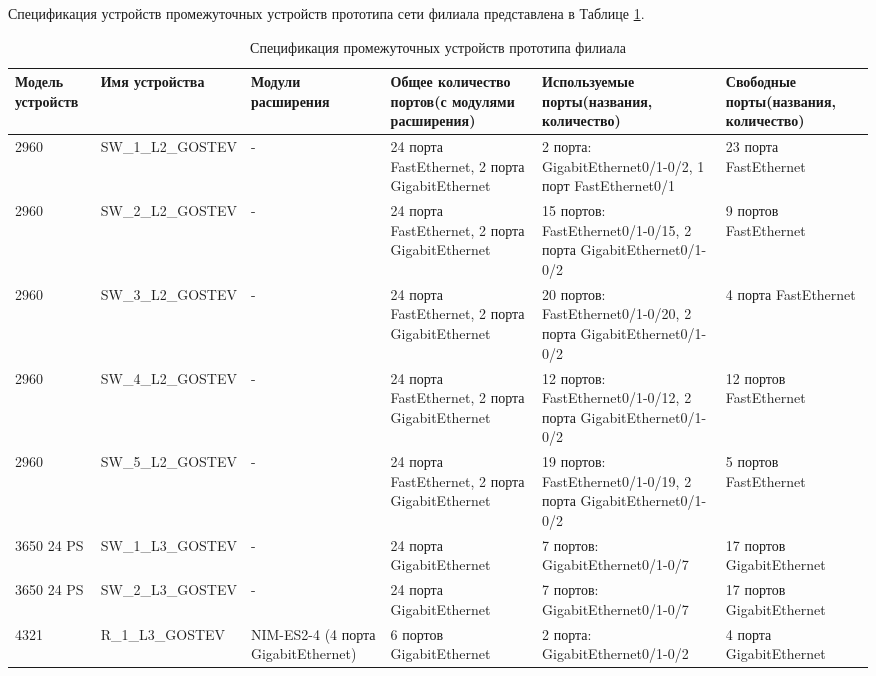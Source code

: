 \documentclass[14pt, a4paper]{extarticle}
\numberwithin{equation}{section}
\begin{document}
\begin{landscape}
        
Спецификация устройств промежуточных устройств прототипа сети филиала представлена в Таблице \ref{table:filialDevicesSpecs}.

\begin{table}[H]
\centering
\small
\caption{Спецификация промежуточных устройств прототипа филиала}
\label{table:filialDevicesSpecs}
\begin{tabular}{|m{2.5cm}|m{4cm}|m{3cm}|m{4.2cm}|m{5.3cm}|m{4cm}|}
\hline
\textbf{Модель устройств} & \textbf{Имя устройства} & \textbf{Модули расширения} & \textbf{Общее количество портов(с модулями расширения)} & \textbf{Используемые порты(названия, количество)} & \textbf{Свободные порты(названия, количество)} \\
\hline
2960 & 
SW\_1\_L2\_GOSTEV & 
- & 
24 порта FastEthernet, 2 порта GigabitEthernet &
2 порта: GigabitEthernet0/1-0/2, 1 порт FastEthernet0/1 &
23 порта FastEthernet \\
\hline
2960 & 
SW\_2\_L2\_GOSTEV & 
- & 
24 порта FastEthernet, 2 порта GigabitEthernet & 
15 портов: FastEthernet0/1-0/15, 2 порта GigabitEthernet0/1-0/2 & 
9 портов FastEthernet \\
\hline
2960 &
SW\_3\_L2\_GOSTEV &
- &
24 порта FastEthernet, 2 порта GigabitEthernet &
20 портов: FastEthernet0/1-0/20, 2 порта GigabitEthernet0/1-0/2 &
4 порта FastEthernet \\
\hline
2960 &
SW\_4\_L2\_GOSTEV &
- &
24 порта FastEthernet, 2 порта GigabitEthernet &
12 портов: FastEthernet0/1-0/12, 2 порта GigabitEthernet0/1-0/2 &
12 портов FastEthernet \\
\hline
2960 &
SW\_5\_L2\_GOSTEV &
- &
24 порта FastEthernet, 2 порта GigabitEthernet &
19 портов: FastEthernet0/1-0/19, 2 порта GigabitEthernet0/1-0/2 &
5 портов FastEthernet \\
\hline
3650 24 PS &
SW\_1\_L3\_GOSTEV &
- &
24 порта GigabitEthernet &
7 портов: GigabitEthernet0/1-0/7 &
17 портов GigabitEthernet \\
\hline
3650 24 PS &
SW\_2\_L3\_GOSTEV &
- &
24 порта GigabitEthernet &
7 портов: GigabitEthernet0/1-0/7 &
17 портов GigabitEthernet \\
\hline
4321 &
R\_1\_L3\_GOSTEV &
NIM-ES2-4 (4 порта GigabitEthernet) &
6 портов GigabitEthernet &
2 порта: GigabitEthernet0/1-0/2 &
4 порта GigabitEthernet \\
\hline
\end{tabular}
\end{table}
\end{landscape}
\end{document}
